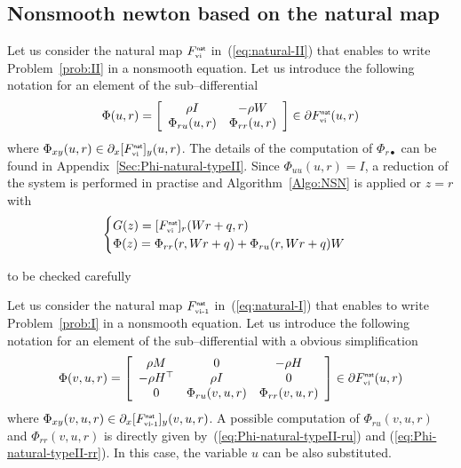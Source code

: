 \subsection{Nonsmooth newton based on the natural map }
Let us consider the natural map $F_{{\hbox{\tiny{vi}}}}^{\hbox{\sf \tiny{nat}}}$ in~(\ref{eq:natural-II}) that enables to write Problem~\ref{prob:II} in a nonsmooth equation. Let us introduce the following notation for an element of the sub--differential
\begin{equation}
  \label{eq:Phi-natural-typeII}
  \Phi(u, r)  = \left[
  \begin{array}{cc}
    \rho  I  &   - \rho W \\
     \Phi_{r u}(u,r) &   \Phi_{r r}(u,r)  
  \end{array}\right] \in \partial F_{\vitwo}^\nat(u,r)
\end{equation}
where $ \Phi_{x y}(u,r) \in \partial_{x}[F_{{\hbox{\tiny{vi}}}}^{\hbox{\sf \tiny{nat}}}]_{y}(u,r)$. The details of the computation of $\Phi_{r \bullet}$ can be found in Appendix~\ref{Sec:Phi-natural-typeII}. Since $\Phi_{u u}(u,r) = I $, a reduction of the system is performed in practise and Algorithm~\ref{Algo:NSN} is applied or $z =r$ with
\begin{equation}
  \label{eq:phiphi}
  \begin{cases}
    G(z) = [F_{\vitwo}^\nat]_{r}(Wr+q,r) \\
    \Phi(z) = \Phi_{rr}(r,Wr+q) + \Phi_{ru}(r,Wr+q) W
  \end{cases}
\end{equation}
\begin{ndrva}
  to be checked carefully
\end{ndrva}

Let us consider the natural map $F_{{\hbox{\tiny{vi-1}}}}^{\hbox{\sf \tiny{nat}}}$ in~(\ref{eq:natural-I}) that enables to write Problem~\ref{prob:I} in a nonsmooth equation. Let us introduce the following notation for an element of the sub--differential with a obvious simplification
\begin{equation}
  \label{eq:Phi-natural-typeI}
  \Phi(v, u, r)  = \left[
  \begin{array}{ccc}
   \rho M &  0 &   - \rho H  \\
   -\rho H^\top &  \rho I &   0  \\
   0  &   \Phi_{r u}(v,u,r) &   \Phi_{r r}(v,u,r)  
 \end{array}\right] \in \partial F_{\vitwo}^\nat(u,r)
\end{equation}
where $ \Phi_{x y}(v,u,r) \in \partial_{x}[F_{{\hbox{\tiny{vi-1}}}}^{\hbox{\sf \tiny{nat}}}]_{y}(v,u,r)$. A possible computation of  $\Phi_{r u}(v,u,r)$ and $\Phi_{r r}(v,u,r) $ is directly given by~(\ref{eq:Phi-natural-typeII-ru}) and (\ref{eq:Phi-natural-typeII-rr}). In this case, the variable $u$ can be also substituted.

